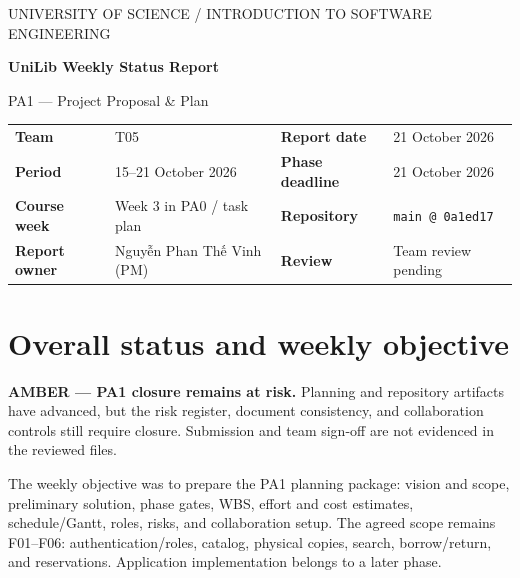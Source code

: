 \documentclass[11pt,a4paper]{article}
\begin{document}
\thispagestyle{empty}
{\sffamily\small UNIVERSITY OF SCIENCE \enspace / \enspace INTRODUCTION TO SOFTWARE ENGINEERING}

\vspace{7pt}
{\sffamily\bfseries\LARGE UniLib Weekly Status Report}\par
{\sffamily\large PA1 --- Project Proposal \& Plan}

\vspace{5pt}
\begin{tabularx}{\textwidth}{@{}P{28mm}YP{28mm}Y@{}}
\textbf{Team} & T05 & \textbf{Report date} & 21 October 2026 \\
\textbf{Period} & 15--21 October 2026 & \textbf{Phase deadline} & 21 October 2026 \\
\textbf{Course week} & Week 3 in PA0 / task plan & \textbf{Repository} & \texttt{main @ 0a1ed17} \\
\textbf{Report owner} & Nguyễn Phan Thế Vinh (PM) & \textbf{Review} & Team review pending \\
\end{tabularx}

\section{Overall status and weekly objective}
\textbf{\textcolor{amber}{AMBER --- PA1 closure remains at risk.}} Planning and repository artifacts have advanced, but the risk register, document consistency, and collaboration controls still require closure. Submission and team sign-off are not evidenced in the reviewed files.

The weekly objective was to prepare the PA1 planning package: vision and scope, preliminary solution, phase gates, WBS, effort and cost estimates, schedule/Gantt, roles, risks, and collaboration setup. The agreed scope remains F01--F06: authentication/roles, catalog, physical copies, search, borrow/return, and reservations. Application implementation belongs to a later phase.
\end{document}
